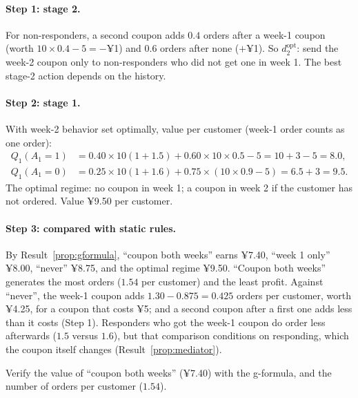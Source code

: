 \documentclass[11pt]{article}
\begin{document}
\paragraph{Step 1: stage 2.} For non-responders, a second coupon adds $0.4$ orders after a week-1 coupon (worth
$10 \times 0.4 - 5 = -$¥1) and $0.6$ orders after none ($+$¥1). So $d_2^{\text{opt}}$: send the week-2 coupon only to non-responders who
did not get one in week 1. The best stage-2 action depends on the history.

\paragraph{Step 2: stage 1.} With week-2 behavior set optimally, value per customer (week-1 order counts as one order):
\begin{align*}
  Q_1(A_1 = 1) &= 0.40 \times 10(1 + 1.5) + 0.60 \times 10 \times 0.5 - 5 = 10 + 3 - 5 = 8.0, \\
  Q_1(A_1 = 0) &= 0.25 \times 10(1 + 1.6) + 0.75 \times (10 \times 0.9 - 5) = 6.5 + 3 = 9.5 .
\end{align*}
The optimal regime: no coupon in week 1; a coupon in week 2 if the customer has not ordered. Value ¥9.50 per customer.

\paragraph{Step 3: compared with static rules.} By Result~\ref{prop:gformula}, ``coupon both weeks'' earns ¥7.40, ``week 1 only'' ¥8.00,
``never'' ¥8.75, and the optimal regime ¥9.50. ``Coupon both weeks'' generates the most orders ($1.54$ per customer) and the least
profit. Against ``never'', the week-1 coupon adds $1.30 - 0.875 = 0.425$ orders per customer, worth ¥4.25, for a coupon that costs
¥5; and a second coupon after a first one adds less than it costs (Step 1). Responders who got the week-1 coupon do order less
afterwards ($1.5$ versus $1.6$), but that comparison conditions on responding, which the coupon itself changes
(Result~\ref{prop:mediator}).

\begin{exercise}[computation]
Verify the value of ``coupon both weeks'' (¥7.40) with the g-formula, and the number of orders per customer ($1.54$).
\end{exercise}
\end{document}
